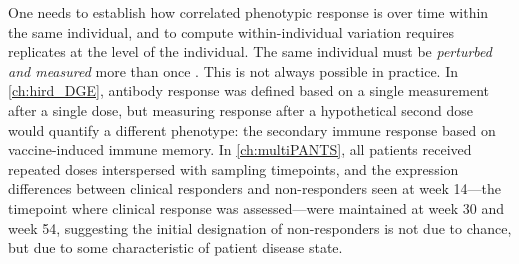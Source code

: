 One needs to establish how correlated phenotypic response is over time within the same individual,
and to compute within-individual variation requires replicates at the level of the individual.
The same individual must be \emph{perturbed and measured} more than once \autocite{senn2016MasteringVariationVariance}.
This is not always possible in practice.
In \cref{ch:hird_DGE}, antibody response was defined based on a single measurement after a single dose,
but measuring response after a hypothetical second dose would quantify a different phenotype: 
the secondary immune response based on vaccine-induced immune memory.
In \cref{ch:multiPANTS}, all patients received repeated doses interspersed with sampling timepoints,
and the expression differences between clinical responders and non-responders seen at week 14---the timepoint where clinical response was assessed---were maintained at week 30 and week 54,
suggesting the initial designation of non-responders is not due to chance, but due to some characteristic of patient disease state.
%

